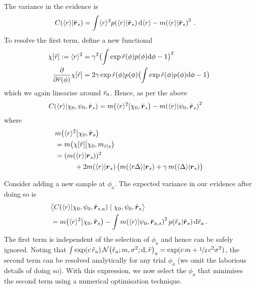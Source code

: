 \documentclass{article}
\begin{document}
The variance in the evidence is
\begin{align*}
\cov{\langle r\rangle}{\tvr_{s}}
& = \int \inty{r}^2 \p{\inty{r}}{\tvr_s} \ud\inty{r}- \mean{\inty{r}}{\tvr_s}^2\,.
\end{align*}
To resolve the first term, define a new functional
\begin{align*}
 \chi[\tr] \deq \inty{r}^2 & = \gamma^2\bigl(\int  \exp \tr(\phi) p(\phi) \ud \phi-1\bigr)^2\\
\pderiv{}{\tr(\phi)}\chi[\tr] & = 2\gamma \exp \tr(\phi) p(\phi) \bigl(\int  \exp \tr(\phi) p(\phi) \ud \phi-1\bigr)
\end{align*}
which we again linearise around $\tr_0$. Hence, as per the above
\begin{align*}
& \cov{\langle r\rangle}{\chi_0,\psi_0,\tvr_{s}} = \mean{\inty{r}^2}{\chi_0,\tvr_s} - \mean{\inty{r}}{\psi_0,\tvr_s}^2
\end{align*}
where
\begin{align*}
&\mean{\inty{r}^2}{\chi_0,\tvr_s} \\
& = \mean{\chi[\tr]}{\chi_0,m_{\tr|s}} \\
& = (\mean{\inty{r}}{\vr_s})^2 \\
& \hspace{1cm} + 2\mean{\inty{r}}{\vr_s}
\bigl(\mean{\inty{r \Delta}}{\vr_s} + \gamma\, \mean{\inty{\Delta}}{\vr_s}\bigr)
\end{align*}


Consider adding a new sample at $\phi_a$. The expected variance in our evidence after doing so is
\begin{align}
& \bigl\langle \cov{\langle r\rangle}{\chi_0,\psi_0,\tvr_{s,a}}\mid \chi_0,\psi_0,\tvr_{s}\bigr\rangle\nonumber\\
& = \mean{\inty{r}^2}{\chi_0,\tvr_s}  - 
\int\mean{\inty{r}}{\psi_0,\tvr_{a,s}}^2\p{\tr_a}{\tvr_s}\ud\tr_a\,.\label{eqn:exp_var}
\end{align}
The first term is independent of the selection of $\phi_a$ and hence can be safely ignored. Noting that $\int \exp(c\, \tr_a)\, \N{\tr_a;m, \sigma^2} \ud\tr_a = \exp(c\, m + \nicefrac{1}{2}\, c^2 \sigma^2)$, the second term can be resolved analytically for any trial $\phi_a$ (we omit the laborious details of doing so). With this expression, we now select the $\phi_a$ that minimises the second term using a numerical optimisation technique. 
\end{document}
